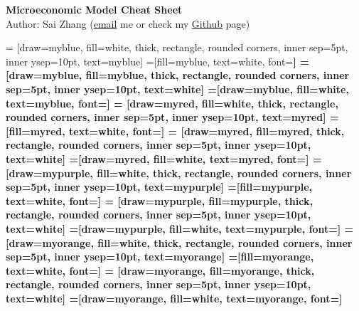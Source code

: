 \documentclass[10pt,landscape,a4paper]{article}
\begin{document}
\begin{center}{\large{\textbf{Microeconomic Model Cheat Sheet}}}\\
Author: Sai Zhang (\href{mailto:saizhang.econ@gmail.com}{email} me or check my \href{https://github.com/SaiChrisZHANG}{Github} page)
\end{center}

\small
\begin{multicols*}{4}

 = [draw=myblue, fill=white, thick, rectangle, rounded corners, inner sep=5pt, inner ysep=10pt, text=myblue]
 =[fill=myblue, text=white, font=\bfseries]
 = [draw=myblue, fill=myblue, thick, rectangle, rounded corners, inner sep=5pt, inner ysep=10pt, text=white]
 =[draw=myblue, fill=white, text=myblue, font=\bfseries]
 = [draw=myred, fill=white, thick, rectangle, rounded corners, inner sep=5pt, inner ysep=10pt, text=myred]
 =[fill=myred, text=white, font=\bfseries]
 = [draw=myred, fill=myred, thick, rectangle, rounded corners, inner sep=5pt, inner ysep=10pt, text=white]
 =[draw=myred, fill=white, text=myred, font=\bfseries]
 = [draw=mypurple, fill=white, thick, rectangle, rounded corners, inner sep=5pt, inner ysep=10pt, text=mypurple]
 =[fill=mypurple, text=white, font=\bfseries]
 = [draw=mypurple, fill=mypurple, thick, rectangle, rounded corners, inner sep=5pt, inner ysep=10pt, text=white]
 =[draw=mypurple, fill=white, text=mypurple, font=\bfseries]
 = [draw=myorange, fill=white, thick, rectangle, rounded corners, inner sep=5pt, inner ysep=10pt, text=myorange]
 =[fill=myorange, text=white, font=\bfseries]
 = [draw=myorange, fill=myorange, thick, rectangle, rounded corners, inner sep=5pt, inner ysep=10pt, text=white]
 =[draw=myorange, fill=white, text=myorange, font=\bfseries]


\end{multicols*}
\end{document}
